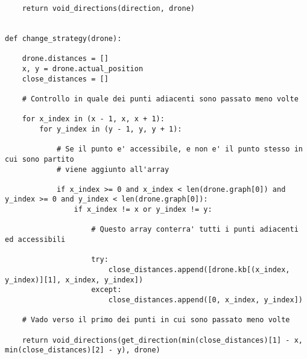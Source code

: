 \begin{verbatim}
    return void_directions(direction, drone)


def change_strategy(drone):

    drone.distances = []
    x, y = drone.actual_position
    close_distances = []

    # Controllo in quale dei punti adiacenti sono passato meno volte

    for x_index in (x - 1, x, x + 1):
        for y_index in (y - 1, y, y + 1):

            # Se il punto e' accessibile, e non e' il punto stesso in cui sono partito
            # viene aggiunto all'array

            if x_index >= 0 and x_index < len(drone.graph[0]) and y_index >= 0 and y_index < len(drone.graph[0]):
                if x_index != x or y_index != y:

                    # Questo array conterra' tutti i punti adiacenti ed accessibili

                    try:
                        close_distances.append([drone.kb[(x_index, y_index)][1], x_index, y_index])
                    except:
                        close_distances.append([0, x_index, y_index])

    # Vado verso il primo dei punti in cui sono passato meno volte

    return void_directions(get_direction(min(close_distances)[1] - x, min(close_distances)[2] - y), drone)
\end{verbatim}
	
